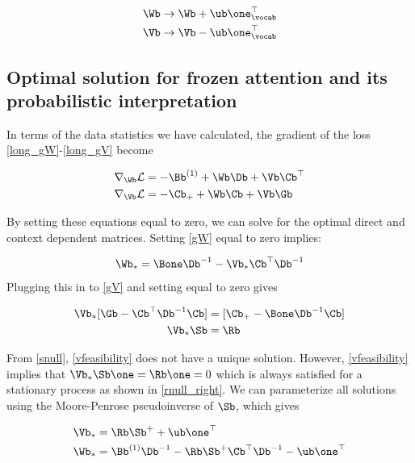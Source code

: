 \documentclass{article}
\begin{document}
\begin{align}\label{param_degen}
    \Wb &\to \Wb + \ub\one_{\vocab}^\top \\
    \Vb &\to \Vb - \ub\one_\vocab^\top
\end{align}


\subsection{Optimal solution for frozen attention and its probabilistic interpretation}
In terms of the data statistics we have calculated, the gradient of the loss \eqref{long_gW}-\eqref{long_gV} become 

\begin{align}
     \nabla_{\Wb}\mathcal{L} &= - \Bb^{(1)}+\Wb \Db + \Vb \Cb^\top \label{gW}\\ 
     \nabla_{\Vb}\mathcal{L} &= - \Cb_{+} + \Wb\Cb + \Vb \Gb \label{gV}
\end{align}

By setting these equations equal to zero, we can solve for the optimal direct and context dependent matrices. Setting \eqref{gW} equal to zero implies:

\begin{align}
    \Wb_* &= \Bone \Db^{-1} - \Vb_*\Cb^\top \Db^{-1} \\  
\end{align}
Plugging this in to \eqref{gV} and setting equal to zero gives

\begin{align}
    \Vb_*[\Gb - \Cb^\top \Db^{-1}\Cb] &= [\Cb_+ - \Bone \Db^{-1}\Cb] \\
    \Vb_* \Sb &= \Rb \label{vfeasibility}
\end{align}

From \eqref{snull}, \eqref{vfeasibility} does not have a unique solution. However, \eqref{vfeasibility} implies that $\Vb_*\Sb\one = \Rb\one=0$ which is always satisfied for a stationary process as shown in \eqref{rnull_right}. We can parameterize all solutions using the Moore-Penrose pseudoinverse of $\Sb$, which gives 

\begin{align}
    \Vb_{*} &= \Rb\Sb^+ + \ub\one^\top \label{vstar}\\
    \Wb_{*} &= \Bb^{(1)}\Db^{-1} - \Rb \Sb^+ \Cb^\top \Db^{-1} - \ub\one^\top\label{wstar}
\end{align}
\end{document}
